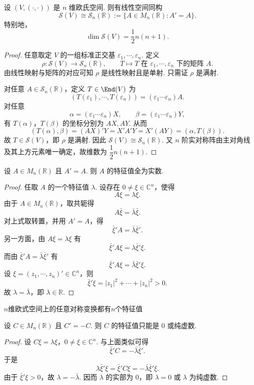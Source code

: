 \begin{corollary}
	设 $(V,(\cdot,\cdot))$ 是 $n$ 维欧氏空间. 则有线性空间同构
	\[
	\mathcal{S}(V)\cong \mathcal{S}_n(\mathbb{R})
	:=\{A\in M_n(\mathbb{R}):A'=A\}.
	\]
	特别地，
	\[
	\dim \mathcal{S}(V)=\frac12 n(n+1).
	\]
\end{corollary}
\begin{proof}
	任意取定 $V$ 的一组标准正交基 $\varepsilon_1,\cdots,\varepsilon_n$. 定义
	\[
	\rho:\mathcal{S}(V)\longrightarrow \mathcal{S}_n(\mathbb{R}),
	\qquad
	T\longmapsto T\text{ 在 }\varepsilon_1,\cdots,\varepsilon_n\text{ 下的矩阵 }A.
	\]
	由线性映射与矩阵的对应可知 $\rho$ 是线性映射且是单射. 只需证 $\rho$ 是满射.
	
	对任意 $A\in\mathcal{S}_n(\mathbb{R})$，定义 $T\in\End(V)$ 为
	\[
	(T(\varepsilon_1),\cdots,T(\varepsilon_n))=(\varepsilon_1\cdots\varepsilon_n)A.
	\]
	对任意
	\[
	\alpha=(\varepsilon_1\cdots\varepsilon_n)X,
	\qquad
	\beta=(\varepsilon_1\cdots\varepsilon_n)Y,
	\]
	有 $T(\alpha)$，$T(\beta)$ 的坐标分别为 $AX,AY$. 从而
	\[
	(T(\alpha),\beta)=(AX)'Y=X'A'Y=X'(AY)=(\alpha,T(\beta)).
	\]
	故 $T\in\mathcal{S}(V)$，即 $\rho$ 是满射. 因此 $\mathcal{S}(V)\cong\mathcal{S}_n(\mathbb{R})$. 又 $n$ 阶实对称阵由主对角线及其上方元素唯一确定，故维数为 $\dfrac12 n(n+1)$.
\end{proof}


\begin{lemma}
	设 $A\in M_n(\mathbb{R})$ 且 $A'=A$. 则 $A$ 的特征值全为实数.
\end{lemma}
\begin{proof}
	任取 $A$ 的一个特征值 $\lambda$. 设存在 $0\ne\xi\in\mathbb{C}^n$，使得
	\[
	A\xi=\lambda\xi.
	\]
	由于 $A\in M_n(\mathbb{R})$，取共轭得
	\[
	A\bar\xi=\bar\lambda\bar\xi.
	\]
	对上式取转置，并用 $A'=A$，得
	\[
	\bar\xi' A=\bar\lambda\bar\xi'.
	\]
	另一方面，由 $A\xi=\lambda\xi$ 有
	\[
	\bar\xi' A\xi=\lambda\bar\xi'\xi.
	\]
	而由 $\bar\xi' A=\bar\lambda\bar\xi'$ 有
	\[
	\bar\xi' A\xi=\bar\lambda\bar\xi'\xi.
	\]
	设 $\xi=(z_1,\cdots,z_n)'\in\mathbb{C}^n$，则
	\[
	\bar\xi'\xi=|z_1|^2+\cdots+|z_n|^2>0.
	\]
	故 $\lambda=\bar\lambda$，即 $\lambda\in\mathbb{R}$.
\end{proof}
$n$维欧式空间上的任意对称变换都有$n$个特征值
\begin{example}
	设 $C\in M_n(\mathbb{R})$ 且 $C'=-C$. 则 $C$ 的特征值只能是 $0$ 或纯虚数.
\end{example}
\begin{proof}
	设 $C\xi=\lambda\xi$，$0\ne\xi\in\mathbb{C}^n$. 与上面类似可得
	\[
	\bar\xi'C=-\bar\lambda\bar\xi'.
	\]
	于是
	\[
	\lambda\bar\xi'\xi=\bar\xi'C\xi=-\bar\lambda\bar\xi'\xi.
	\]
	由于 $\bar\xi'\xi>0$，故 $\lambda=-\bar\lambda$. 因而 $\lambda$ 的实部为 $0$，即 $\lambda=0$ 或 $\lambda$ 为纯虚数.
\end{proof}

